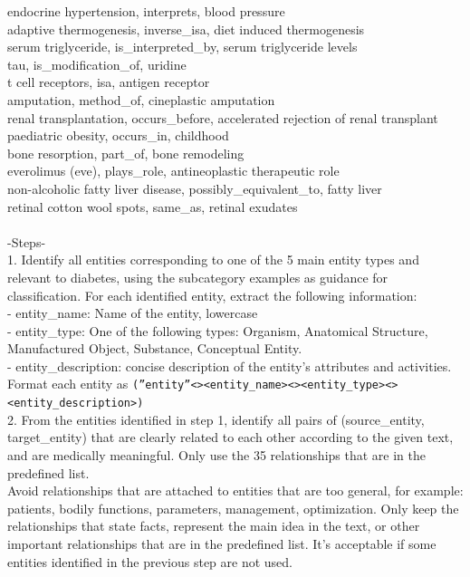 \documentclass[10pt]{article}
\begin{document}
\begin{appendices}
\begin{tcolorbox}
endocrine hypertension,	interprets,	blood pressure\\
adaptive thermogenesis, inverse\_isa, diet induced thermogenesis\\
serum triglyceride, is\_interpreted\_by, serum triglyceride levels\\
tau, is\_modification\_of, uridine\\
t cell receptors, isa, antigen receptor\\
amputation, method\_of, cineplastic amputation\\
renal transplantation, occurs\_before, accelerated rejection of renal transplant\\
paediatric obesity, occurs\_in, childhood\\
bone resorption, part\_of, bone remodeling\\
everolimus (eve), plays\_role, antineoplastic therapeutic role\\
non-alcoholic fatty liver disease, possibly\_equivalent\_to, fatty liver\\
retinal cotton wool spots, same\_as, retinal exudates\\
\\

-Steps-\\
1. Identify all entities corresponding to one of the 5 main entity types and relevant to diabetes, using the subcategory examples as guidance for classification. 
For each identified entity, extract the following information:\\
- entity\_name: Name of the entity, lowercase\\
- entity\_type: One of the following types: Organism, Anatomical Structure, Manufactured Object, Substance, Conceptual Entity.\\
- entity\_description: concise description of the entity's attributes and activities.
Format each entity as \texttt{(''entity''\textless\textbar\textgreater\textless entity\_name\textgreater\textless\textbar\textgreater\textless entity\_type\textgreater\textless\textbar\textgreater\textless entity\_description\textgreater)}\\
 
2. From the entities identified in step 1, identify all pairs of (source\_entity, target\_entity) that are clearly related to each other according to the given text, and are medically meaningful. 
Only use the 35 relationships that are in the predefined list.\\

Avoid relationships that are attached to entities that are too general, for example: patients, bodily functions, parameters, management, optimization.
Only keep the relationships that state facts, represent the main idea in the text, or other important relationships that are in the predefined list.
It's acceptable if some entities identified in the previous step are not used.\\


\end{tcolorbox}
\end{appendices}
\end{document}
